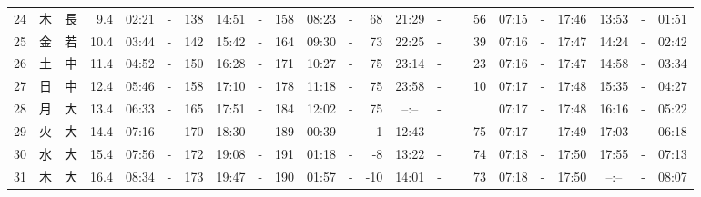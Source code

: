 \documentclass[12pt,a4j]{jsarticle}
\begin{document}
\begin{table}[htbp]
\begin{center}
{\begin{tabular}{|rc|cr|ccrccr|ccrccr|ccc|ccc|}
24 & 木 & 長 &  9.4 &  02:21 &-& 138 &  14:51 &-& 158 &  08:23 &-&  68 &  21:29 &-&  56 & 07:15 & -& 17:46 & 13:53 & -& 01:51 \\
25 & 金 & 若 & 10.4 &  03:44 &-& 142 &  15:42 &-& 164 &  09:30 &-&  73 &  22:25 &-&  39 & 07:16 & -& 17:47 & 14:24 & -& 02:42 \\
26 & 土 & 中 & 11.4 &  04:52 &-& 150 &  16:28 &-& 171 &  10:27 &-&  75 &  23:14 &-&  23 & 07:16 & -& 17:47 & 14:58 & -& 03:34 \\
27 & 日 & 中 & 12.4 &  05:46 &-& 158 &  17:10 &-& 178 &  11:18 &-&  75 &  23:58 &-&  10 & 07:17 & -& 17:48 & 15:35 & -& 04:27 \\
28 & 月 & 大 & 13.4 &  06:33 &-& 165 &  17:51 &-& 184 &  12:02 &-&  75 &  --:-- &-&~~~~~ & 07:17 & -& 17:48 & 16:16 & -& 05:22 \\
29 & 火 & 大 & 14.4 &  07:16 &-& 170 &  18:30 &-& 189 &  00:39 &-&  -1 &  12:43 &-&  75 & 07:17 & -& 17:49 & 17:03 & -& 06:18 \\
30 & 水 & 大 & 15.4 &  07:56 &-& 172 &  19:08 &-& 191 &  01:18 &-&  -8 &  13:22 &-&  74 & 07:18 & -& 17:50 & 17:55 & -& 07:13 \\
31 & 木 & 大 & 16.4 &  08:34 &-& 173 &  19:47 &-& 190 &  01:57 &-& -10 &  14:01 &-&  73 & 07:18 & -& 17:50 & --:-- & -& 08:07 \\
   \hline
   \end{tabular}}
   \end{center}
\end{table}
\newpage
\end{document}
